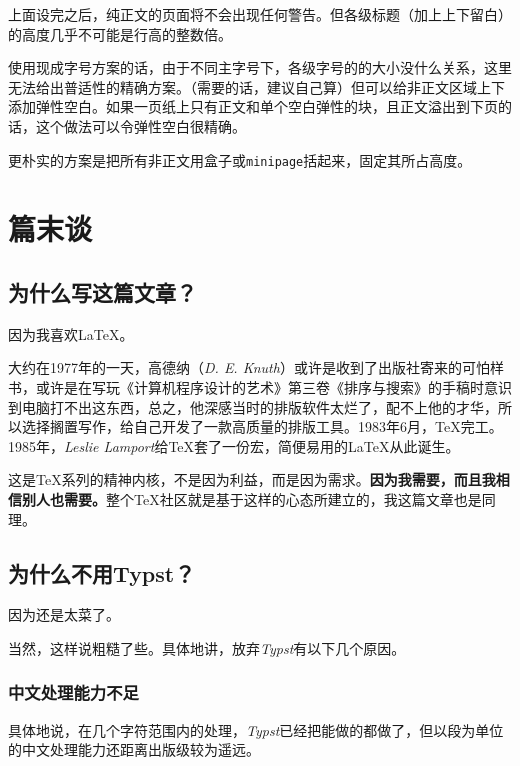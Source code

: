 \documentclass[10pt,openany]{book}
\begin{document}
\begin{sloppypar}
上面设完之后，纯正文的页面将不会出现任何警告。但各级标题（加上上下留白）的高度几乎不可能是行高的整数倍。

使用现成字号方案的话，由于不同主字号下，各级字号的的大小没什么关系，这里无法给出普适性的精确方案。（需要的话，建议自己算）但可以给非正文区域上下添加弹性空白。如果一页纸上只有正文和单个空白弹性的块，且正文溢出到下页的话，这个做法可以令弹性空白很精确。



更朴实的方案是把所有非正文用盒子或\texttt{minipage}括起来，固定其所占高度。



\chapter{篇末谈}

\section{为什么写这篇文章？}

因为我喜欢{\LaTeX}。

大约在1977年的一天，高德纳（\textit{D. E. Knuth}）或许是收到了出版社寄来的可怕样书，或许是在写玩《计算机程序设计的艺术》第三卷《排序与搜索》的手稿时意识到电脑打不出这东西，总之，他深感当时的排版软件太烂了，配不上他的才华，所以选择搁置写作，给自己开发了一款高质量的排版工具。1983年6月，{\TeX}完工。1985年，\textit{Leslie Lamport}给{\TeX}套了一份宏，简便易用的{\LaTeX}从此诞生。

这是{\TeX}系列的精神内核，不是因为利益，而是因为需求。\textbf{因为我需要，而且我相信别人也需要。}整个{\TeX}社区就是基于这样的心态所建立的，我这篇文章也是同理。

\section{为什么不用Typst？}

因为还是太菜了。

当然，这样说粗糙了些。具体地讲，放弃\textit{Typst}有以下几个原因。

\subsection{中文处理能力不足}

具体地说，在几个字符范围内的处理，\textit{Typst}已经把能做的都做了，但以段为单位的中文处理能力还距离出版级较为遥远。


\end{sloppypar}
\end{document}
